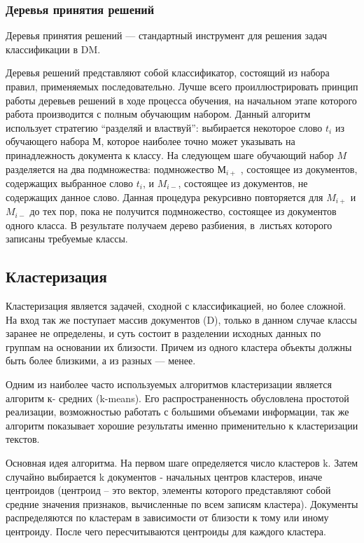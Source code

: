 \subsubsection{Деревья принятия решений}

Деревья принятия решений --- стандартный инструмент для решения задач классификации в DM. 

Деревья решений представляют собой классификатор, состоящий из набора правил, применяемых последовательно. 
Лучше всего проиллюстрировать принцип работы деревьев решений в ходе процесса
обучения, на начальном этапе которого работа производится с полным обучающим набором.
Данный алгоритм использует стратегию ``разделяй и властвуй'': 
выбирается некоторое слово $t_i$ из обучающего набора $М$, 
которое наиболее точно может указывать на принадлежность документа к классу. 
На следующем шаге обучающий набор $M$ разделяется на два подмножества:
подмножество $М_{i+}$ , состоящее из документов, содержащих выбранное слово $t_i$, и $M_{i-}$, 
состоящее из документов, не содержащих данное слово. Данная процедура рекурсивно повторяется для $M_{i+}$ и $M_{i-}$
до тех пор, пока не получится подмножество, состоящее из документов одного класса. В результате
получаем дерево разбиения, в~листьях которого записаны требуемые классы.

\subsection{Кластеризация}

Кластеризация является задачей, сходной с классификацией, но более сложной. На вход так же поступает массив
документов (D), только в данном случае классы заранее не определены, и суть состоит в разделении исходных
данных по группам на основании их близости. Причем из одного кластера объекты должны быть более близкими,
а из разных --- менее.

Одним из наиболее часто используемых алгоритмов кластеризации является алгоритм
к- средних (k-means). Его распространенность обусловлена простотой реализации,
возможностью работать с большими объемами информации, так же алгоритм показывает
хорошие результаты именно применительно к кластеризации текстов. 

Основная идея алгоритма.
На первом шаге определяется число кластеров k. Затем случайно выбирается k документов - начальных
центров кластеров, иначе центроидов (центроид – это вектор, элементы которого представляют собой 
средние значения признаков, вычисленные по всем записям кластера). Документы распределяются по 
кластерам в зависимости от близости к тому или иному центроиду. После чего пересчитываются центроиды 
для каждого кластера. 

